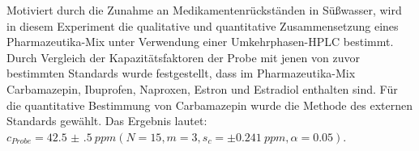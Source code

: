 Motiviert durch die Zunahme an Medikamentenrückständen in Süßwasser, wird in diesem Experiment die qualitative und quantitative Zusammensetzung eines Pharmazeutika-Mix unter Verwendung einer Umkehrphasen-HPLC bestimmt. Durch Vergleich der Kapazitätsfaktoren der Probe mit jenen von zuvor bestimmten Standards wurde festgestellt, dass im Pharmazeutika-Mix Carbamazepin, Ibuprofen, Naproxen, Estron und Estradiol enthalten sind. Für die quantitative Bestimmung von Carbamazepin wurde die Methode des externen Standards gewählt. Das Ergebnis lautet: $c_{Probe} = \SI[mode=text, multi-part-units = brackets, separate-uncertainty]{42.5(5)}{ppm} \left(N = 15, m = 3, s_c = \pm \SI[mode=text]{0.241}{ppm}, \alpha = 0.05\right)$.